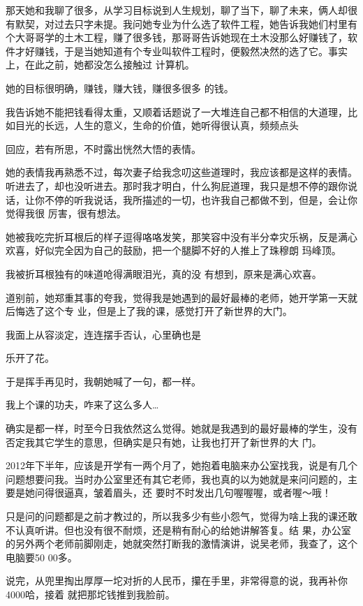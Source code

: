\documentclass{article}
\begin{document}
那天她和我聊了很多，从学习目标说到人生规划，聊了当下，聊了未来，俩人却很有默契，对过去只字未提。我问她专业为什么选了软件工程，她告诉我她们村里有个大哥哥学的土木工程，赚了很多钱，那哥哥告诉她现在土木没那么好赚钱了，软件才好赚钱，于是当她知道有个专业叫软件工程时，便毅然决然的选了它。事实上，在此之前，她都没怎么接触过
计算机。 

她的目标很明确，赚钱，赚大钱，赚很多很多
的钱。 

我告诉她不能把钱看得太重，又顺着话题说了一大堆连自己都不相信的大道理，比如目光的长远，人生的意义，生命的价值，她听得很认真，频频点头

\newpage
回应，若有所思，不时露出恍然大悟的表情。 

她的表情我再熟悉不过，每次妻子给我念叨这些道理时，我应该都是这样的表情。听进去了，却也没听进去。那时我才明白，什么狗屁道理，我只是想不停的跟你说话，让你不停的听我说话，我所描述的一切，也许我自己都做不到，但是，会让你觉得我很
厉害，很有想法。 

她被我吃完折耳根后的样子逗得咯咯发笑，那笑容中没有半分幸灾乐祸，反是满心欢喜，好似完全因为自己的鼓励，把一个腿脚不好的人推上了珠穆朗
玛峰顶。 

我被折耳根独有的味道呛得满眼泪光，真的没
有想到，原来是满心欢喜。 

道别前，她郑重其事的夸我，觉得我是她遇到的最好最棒的老师，她开学第一天就后悔选了这个专
业，但是上了我的课，感觉打开了新世界的大门。 

我面上从容淡定，连连摆手否认，心里确也是
\newpage

乐开了花。 

于是挥手再见时，我朝她喊了一句，都一样。



我上个课的功夫，咋来了这么多人… 

确实是都一样，时至今日我依然这么觉得。她就是我遇到的最好最棒的学生，没有否定我其它学生的意思，但确实是只有她，让我也打开了新世界的大
门。 

2012年下半年，应该是开学有一两个月了，她抱着电脑来办公室找我，说是有几个问题想要问我。当时办公室里还有其它老师，我也真的以为她就是来问问题的，主要是她问得很逼真，皱着眉头，还
要时不时发出几句喔喔喔，或者喔～哦！ 

只是问的问题都是之前才教过的，所以我多少有些小怨气，觉得为啥上我的课还敢不认真听讲。但也没有很不耐烦，还是稍有耐心的给她讲解答复。结
\newpage
果，办公室的另外两个老师前脚刚走，她就突然打断我的激情演讲，说吴老师，我查了，这个电脑要50
00多。 

说完，从兜里掏出厚厚一坨对折的人民币，攥在手里，非常得意的说，我再补你4000哈，接着
就把那坨钱推到我脸前。 
\end{document}
